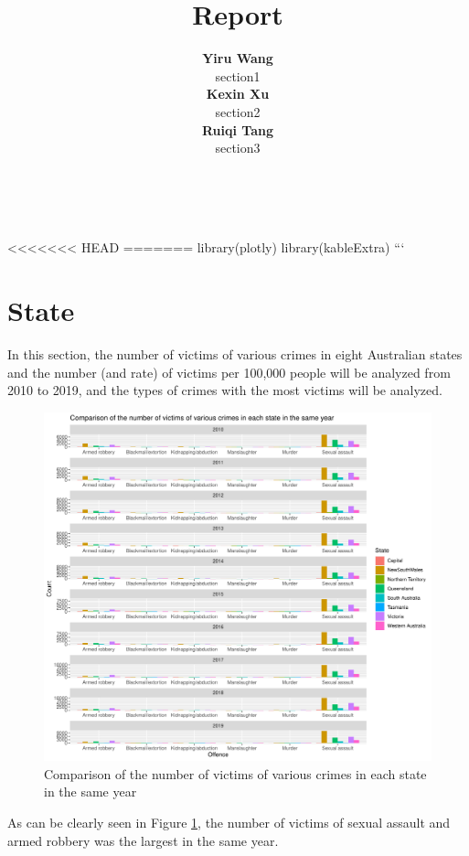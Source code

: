 \documentclass[11pt,a4paper,]{article}
\title{Report}
\author{\sf\Large\textbf{ Yiru Wang}\\ {\sf\large section1\\[0.5cm]} \sf\Large\textbf{ Kexin Xu}\\ {\sf\large section2\\[0.5cm]} \sf\Large\textbf{ Ruiqi Tang}\\ {\sf\large section3\\[0.5cm]}}
\date{\sf\Date~\Month~\Year}
\makeatletter
\def\titlepage{\front{\expandafter{\@title}}{\@author}{\@organization}}
\makeatother
\begin{document}
\titlepage

<<<<<<< HEAD
=======
library(plotly)
library(kableExtra)
```

\clearpage

\section*{State}

In this section, the number of victims of various crimes in eight Australian states and the number (and rate) of victims per 100,000 people will be analyzed from 2010 to 2019, and the types of crimes with the most victims will be analyzed.

\begin{figure}
\centering
\includegraphics{report_files/figure-latex/plot1-1.pdf}
\caption{\label{fig:plot1}Comparison of the number of victims of various crimes in each state in the same year}
\end{figure}

As can be clearly seen in Figure \ref{fig:plot1}, the number of victims of sexual assault and armed robbery was the largest in the same year.
\end{document}
